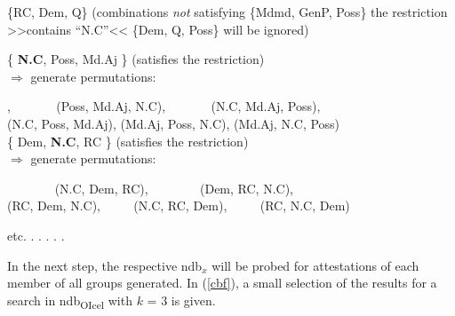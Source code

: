 \documentclass[output=paper,colorlinks,citecolor=brown,draft]{langscibook}
\begin{document}
\begin{exe}
  \ex \label{nons}
{\color{gray}    \begin{xlist}
      \ex\{RC, Dem, Q\}  \hfill  (combinations \textit{not} satisfying
     \ex \{Mdmd, GenP, Poss\} \hfill  the restriction  >>contains ``N.C''<<
     \ex \{Dem, Q, Poss\}  \hfill   will be ignored) \\ 
       \end{xlist} }

  \ex \label{perms}
    \begin{xlist}

      \ex  \{ \textbf{N.C}, Poss, Md.Aj \} \hfill (satisfies the restriction) \\ $\Rightarrow$  generate permutations:  
    
        , { \ \ \ \ \ \ }  {(Poss, Md.Aj, N.C)},  { \ \ \ \ \ \ }    {(N.C, Md.Aj, Poss)},  \\
      {(N.C, Poss, Md.Aj),} {}  {(Md.Aj, Poss, N.C),} {} {(Md.Aj, N.C, Poss) } \\  
 
      \ex  \{ Dem,  \textbf{N.C}, RC \} \hfill (satisfies the restriction) \\ 
      $\Rightarrow$  generate permutations:   
      
        { \ \ \ \ \ \ \ } {(N.C, Dem, RC),} { \ \ \ \ \ \ \  } {(Dem, RC, N.C),} \\ 
      {(RC, Dem, N.C),}  { \ \ \ \  }  {(N.C, RC, Dem),} { \ \ \ \  } {(RC, N.C, Dem)} \\  

\end{xlist}
 etc. . . . . .
\end{exe} 

\largerpage[2]
In the next step, the respective ndb$_x$ will be probed for attestations of each member of all  groups generated.  In (\ref{cbf}), a small selection of the results for a search in  ndb\textsubscript{OIcel} with $k$ = 3 is given.  
\end{document}
